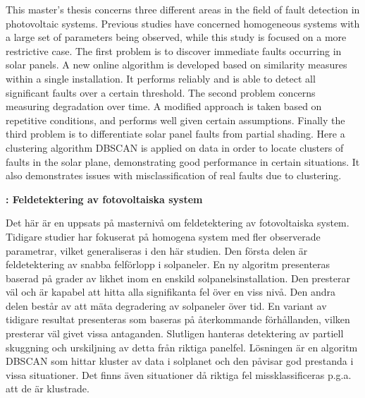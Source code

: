 \newenvironment{abstractpage}
  {\cleardoublepage\vspace*{\fill}\thispagestyle{empty}}
  {\vfill\cleardoublepage}
\newenvironment{polyAbstract}[2]
  {\bigskip\selectlanguage{#1}%
   \begin{center}\bfseries \abstractname {#2}\end{center}}
  {\par\bigskip}

\begin{abstractpage}
\begin{polyAbstract}{english}{}
This master's thesis concerns three different areas in the field of fault detection in photovoltaic systems.
Previous studies have concerned homogeneous systems with a large set of parameters being observed, while this study is focused on a more restrictive case.
The first problem is to discover immediate faults occurring in solar panels.
A new online algorithm is developed based on similarity measures within a single installation.
It performs reliably and is able to detect all significant faults over a certain threshold.
The second problem concerns measuring degradation over time.
A modified approach is taken based on repetitive conditions, and performs well given certain assumptions.
Finally the third problem is to differentiate solar panel faults from partial shading.
Here a clustering algorithm DBSCAN is applied on data in order to locate clusters of faults in the solar plane, demonstrating good performance in certain situations.
It also demonstrates issues with misclassification of real faults due to clustering.

\end{polyAbstract}

\begin{polyAbstract}{swedish}{: Feldetektering av fotovoltaiska system}
Det här är en uppsats på masternivå om feldetektering av fotovoltaiska system.
Tidigare studier har fokuserat på homogena system med fler observerade parametrar, vilket generaliseras i den här studien.
Den första delen är feldetektering av snabba felförlopp i solpaneler.
En ny algoritm presenteras baserad på grader av likhet inom en enskild solpanelsinstallation.
Den presterar väl och är kapabel att hitta alla signifikanta fel över en viss nivå.
Den andra delen består av att mäta degradering av solpaneler över tid.
En variant av tidigare resultat presenteras som baseras på återkommande förhållanden, vilken presterar väl givet vissa antaganden.
Slutligen hanteras detektering av partiell skuggning och urskiljning av detta från riktiga panelfel.
Lösningen är en algoritm DBSCAN som hittar kluster av data i solplanet och den påvisar god prestanda i vissa situationer.
Det finns även situationer då riktiga fel missklassificeras p.g.a. att de är klustrade.

\end{polyAbstract}
\end{abstractpage}

